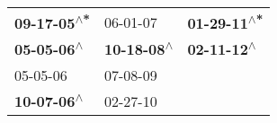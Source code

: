 \begin{supertabular}{lll}
 \textbf{09-17-05\textsuperscript{$\wedge$*}} &                   06-01-07\textsuperscript{} &  \textbf{01-29-11\textsuperscript{$\wedge$*}} \\
  \textbf{05-05-06\textsuperscript{$\wedge$}} &  \textbf{10-18-08\textsuperscript{$\wedge$}} &   \textbf{02-11-12\textsuperscript{$\wedge$}} \\
                   05-05-06\textsuperscript{} &                   07-08-09\textsuperscript{} &                                               \\
  \textbf{10-07-06\textsuperscript{$\wedge$}} &                   02-27-10\textsuperscript{} &                                               \\
\end{supertabular}
